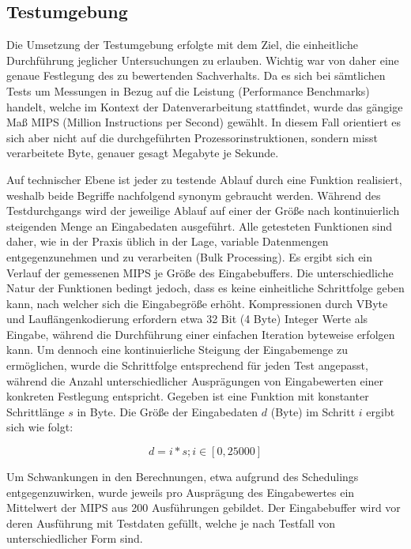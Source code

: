 \subsection{Testumgebung}
Die Umsetzung der Testumgebung erfolgte mit dem Ziel, die einheitliche Durchführung jeglicher Untersuchungen zu erlauben. Wichtig war von daher eine genaue Festlegung des zu bewertenden Sachverhalts. Da es sich bei sämtlichen Tests um Messungen in Bezug auf die Leistung (Performance Benchmarks) handelt, welche im Kontext der Datenverarbeitung stattfindet, wurde das gängige Maß MIPS (Million Instructions per Second) gewählt. In diesem Fall orientiert es sich aber nicht auf die durchgeführten Prozessorinstruktionen, sondern misst verarbeitete Byte, genauer gesagt Megabyte je Sekunde. 

Auf technischer Ebene ist jeder zu testende Ablauf durch eine Funktion realisiert, weshalb beide Begriffe nachfolgend synonym gebraucht werden. Während des Testdurchgangs wird der jeweilige Ablauf auf einer der Größe nach kontinuierlich steigenden Menge an Eingabedaten ausgeführt. Alle getesteten Funktionen sind daher, wie in der Praxis üblich in der Lage, variable Datenmengen entgegenzunehmen und zu verarbeiten (Bulk Processing). Es ergibt sich ein Verlauf der gemessenen MIPS je Größe des Eingabebuffers. Die unterschiedliche Natur der Funktionen bedingt jedoch, dass es keine einheitliche Schrittfolge geben kann, nach welcher sich die Eingabegröße erhöht. Kompressionen durch VByte und Lauflängenkodierung erfordern etwa 32 Bit (4 Byte) Integer Werte als Eingabe, während die Durchführung einer einfachen Iteration byteweise erfolgen kann. Um dennoch eine kontinuierliche Steigung der Eingabemenge zu ermöglichen, wurde die Schrittfolge entsprechend für jeden Test angepasst, während die Anzahl unterschiedlicher Ausprägungen von Eingabewerten einer konkreten Festlegung entspricht. Gegeben ist eine Funktion mit konstanter Schrittlänge $s$ in Byte. Die Größe der Eingabedaten $d$ (Byte) im Schritt $i$ ergibt sich wie folgt: 

\begin{equation*}
	d = i * s; i \in [0, 25000]
\end{equation*}

Um Schwankungen in den Berechnungen, etwa aufgrund des Schedulings entgegenzuwirken, wurde jeweils pro Ausprägung des Eingabewertes ein Mittelwert der MIPS aus 200 Ausführungen gebildet. Der Eingabebuffer wird vor deren Ausführung mit Testdaten gefüllt, welche je nach Testfall von unterschiedlicher Form sind.


